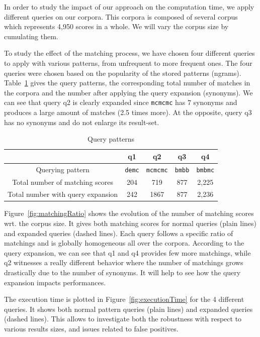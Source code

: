 \documentclass[letterpaper, 11pt]{article}
\begin{document}

In order to study the impact of our approach on the computation time, 
we apply different queries on our corpora. This corpora is composed of several corpus which represents 4,950  scores in a whole.
We will vary the corpus size by cumulating them.

To study the effect of the matching process, we have chosen four different queries to apply with various patterns, from unfrequent to more frequent ones.
The four queries were chosen 
based on the popularity of the stored patterns (ngrams). 
Table~\ref{tab:queryPatterns} gives the query patterns, the corresponding total number of matches in the corpora and the number after applying the query expansion (synonyms). We can see that query q2 is clearly expanded since \texttt{mcmcmc} has 7 synonyms and produces a large amount of matches (2.5 times more). At the opposite, query q3 has no synonyms and do not enlarge its result-set.

\begin{table}[h]
\begin{tabular}{c|c|c|c|c}
							& q1 & q2 & q3 & q4\\
\hline
Querying pattern & \texttt{demc} & \texttt{mcmcmc} & \texttt{bmbb} & \texttt{bmbmc}\\
\hline
Total number of matching scores & 204 & 719 & 877 & 2,225\\
\hline
Total number with query expansion & 242 & 1867 & 877 & 2,236\\
\end{tabular}
\caption{\label{tab:queryPatterns}Query patterns}
\end{table}

Figure~\ref{fig:matchingRatio} shows the evolution of the number of matching scores wrt. the corpus size. It gives both matching scores for normal queries (plain lines) and expanded queries (dashed lines). 
Each query follows a specific ratio of matchings and is globally homogeneous all over the corpora. 
According to the query expansion, we can see that q1 and q4 provides few more matchings, while q2 witnesses a really different behavior where the number of matchings grows drastically due to the number of synonyms. It will help to see how the query expansion impacts performances.



The execution time is plotted in Figure~\ref{fig:executionTime} for the 4 different queries.
It shows both normal pattern queries (plain lines) and expanded queries (dashed lines).
This allows to investigate both the robustness 
with respect to various results sizes, and issues related to false positives.
\end{document}
